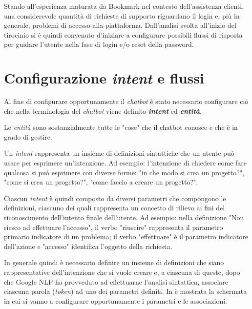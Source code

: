 Stando all'esperienza maturata da Bookmark nel contesto dell'assistenza clienti, una considerevole quantità di richieste di supporto riguardano il login e, più in generale, problemi di accesso alla piattaforma.
%
Dall'analisi svolta all'inizio del tirocinio si è quindi convenuto d'iniziare a configurare possibili flussi di risposta per guidare l'utente nella fase di login e/o reset della password. 

\section{Configurazione \textit{intent} e flussi}
Al fine di configurare opportunamente il \textit{chatbot} è stato necessario configurare ciò che nella terminologia del \textit{chatbot} viene definito \textbf{\textit{intent}} ed \textbf{\textit{entità}}.

Le \textit{entità} sono sostanzialmente tutte le "cose" che il chatbot conosce e che è in grado di gestire. 

Un \textit{intent} rappresenta un insieme di definizioni sintattiche che un utente può usare per esprimere un'intenzione.
%
Ad esempio: l'intenzione di chiedere come fare qualcosa si può esprimere con diverse forme: "in che modo si crea un progetto?", "come si crea un progetto?", "come faccio a creare un progetto?".

Ciascun \textit{intent} è quindi composto da diversi parametri che compongono le definizioni, ciascuno dei quali rappresenta un concetto di rilievo ai fini del riconoscimento dell'intento finale dell'utente. 
%
Ad esempio: nella definizione "Non riesco ad effettuare l'accesso", il verbo "riuscire" rappresenta il parametro primario indicatore di un problema; il verbo "effettuare" è il parametro indicatore dell'azione e "accesso" identifica l'oggetto della richiesta. 

In generale quindi è necessario definire un insieme di definizioni che siano rappresentative dell'intenzione che si vuole creare e, a ciascuna di queste, dopo che Google NLP ha provveduto ad effettuarne l'analisi sintattica, associare ciascuna parola (\textit{token}) ad uno dei parametri definiti.
%
In  è mostrata la schermata in cui si vanno a configurare opportunamente i parametri e le associazioni.

